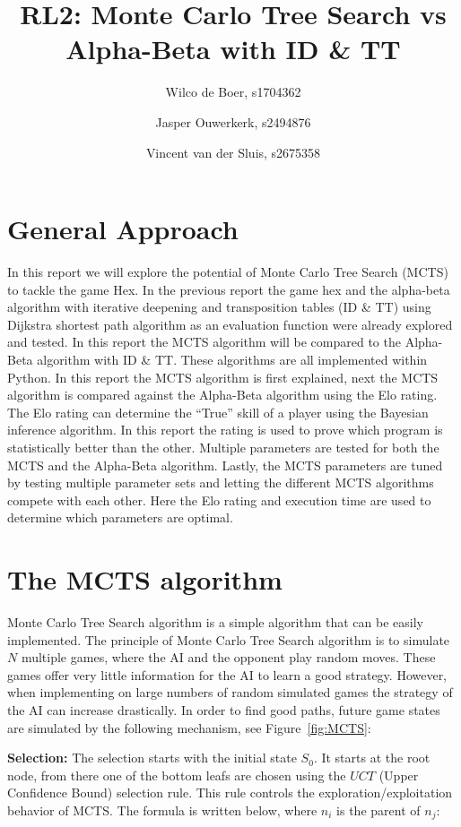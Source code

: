 \documentclass{article}
\title{RL2: Monte Carlo Tree Search vs Alpha-Beta with ID \& TT}
\author{Wilco de Boer, s1704362 \and Jasper Ouwerkerk, s2494876 \and Vincent van der Sluis, s2675358}
\begin{document}
\maketitle

\section{General Approach}
In this report we will explore the potential of Monte Carlo Tree Search (MCTS) \cite{MCTS} to tackle the game Hex. In the previous report the game hex and the alpha-beta\cite{alpha-beta} algorithm with iterative deepening \cite{ID} and transposition tables \cite{TT} (ID \& TT) using Dijkstra shortest path algorithm \cite{Dijkstra} as an evaluation function were already explored and tested. In this report the MCTS algorithm will be compared to the Alpha-Beta algorithm with ID \& TT. These algorithms are all implemented within Python.
In this report the MCTS algorithm is first explained, next the MCTS algorithm is compared against the Alpha-Beta algorithm using the Elo rating\cite{Elo}. The Elo rating can determine the ``True'' skill of a player using the Bayesian inference algorithm. In this report the rating is used to prove which program is statistically better than the other. Multiple parameters are tested for both the MCTS and the Alpha-Beta algorithm.
Lastly, the MCTS parameters are tuned by testing multiple parameter sets and letting the different MCTS algorithms compete with each other. Here the Elo rating and execution time are used to determine which parameters are optimal.

\section{The MCTS algorithm}
Monte Carlo Tree Search algorithm is a simple algorithm that can be easily implemented. The principle of Monte Carlo Tree Search algorithm is to simulate $N$ multiple games, where the AI and the opponent play random moves. These games offer very little information for the AI to learn a good strategy. However, when implementing on large numbers of random simulated games the strategy of the AI can increase drastically. In order to find good paths, future game states are simulated by the following mechanism, see Figure~\ref{fig:MCTS}:

\textbf{Selection:} The selection starts with the initial state $S_0$. It starts at the root node, from there one of the bottom leafs are chosen using the $UCT$ (Upper Confidence Bound) selection rule. This rule controls the exploration/exploitation behavior of MCTS. The formula is written below, where $n_i$ is the parent of $n_j$:
\end{document}

